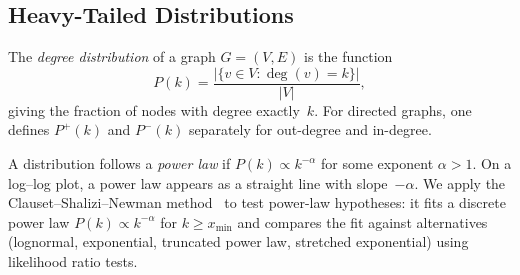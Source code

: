 \subsection{Heavy-Tailed Distributions}
\label{sec:prelim-powerlaw}

\begin{definition}
\label{def:degree-distribution}
The \emph{degree distribution} of a graph $G = (V, E)$ is the function
\[
  P(k) = \frac{|\{v \in V : \deg(v) = k\}|}{|V|},
\]
giving the fraction of nodes with degree exactly~$k$. For directed graphs, one defines $P^{+}(k)$ and $P^{-}(k)$ separately for out-degree and in-degree.
\end{definition}

A distribution follows a \emph{power law} if $P(k) \propto k^{-\alpha}$ for some exponent $\alpha > 1$. On a log--log plot, a power law appears as a straight line with slope~$-\alpha$. We apply the Clauset--Shalizi--Newman method~\cite{clauset2009} to test power-law hypotheses: it fits a discrete power law $P(k) \propto k^{-\alpha}$ for $k \ge x_{\min}$ and compares the fit against alternatives (lognormal, exponential, truncated power law, stretched exponential) using likelihood ratio tests.
